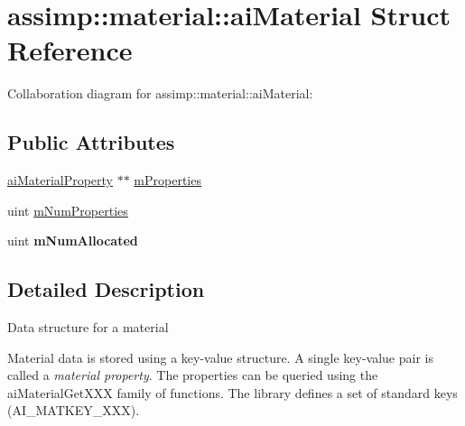 \hypertarget{structassimp_1_1material_1_1ai_material}{\section{assimp\+:\+:material\+:\+:ai\+Material Struct Reference}
\label{structassimp_1_1material_1_1ai_material}
}


Collaboration diagram for assimp\+:\+:material\+:\+:ai\+Material\+:
\subsection*{Public Attributes}
\begin{DoxyCompactItemize}
\item 
\hyperlink{structassimp_1_1material_1_1ai_material_property}{ai\+Material\+Property} $\ast$$\ast$ \hyperlink{structassimp_1_1material_1_1ai_material_a300cd9502dcd87f1063e4a758bdf964e}{m\+Properties}
\item 
uint \hyperlink{structassimp_1_1material_1_1ai_material_a158d737c0c104c6523e75096c184ef7b}{m\+Num\+Properties}
\item 
\hypertarget{structassimp_1_1material_1_1ai_material_a54b3b2e508250237304f9bc70a9ea788}{uint {\bfseries m\+Num\+Allocated}}\label{structassimp_1_1material_1_1ai_material_a54b3b2e508250237304f9bc70a9ea788}

\end{DoxyCompactItemize}


\subsection{Detailed Description}
Data structure for a material

Material data is stored using a key-\/value structure. A single key-\/value pair is called a {\itshape material property}. The properties can be queried using the {\ttfamily ai\+Material\+Get\+X\+X\+X} family of functions. The library defines a set of standard keys (A\+I\+\_\+\+M\+A\+T\+K\+E\+Y\+\_\+\+X\+X\+X). 

